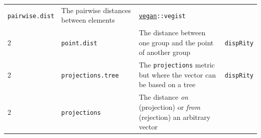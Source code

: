 \documentclass[]{book}
\begin{document}
\begin{longtable}[]{@{}llll@{}}
\begin{minipage}[t]{0.07\columnwidth}
\texttt{pairwise.dist}\strut
\end{minipage} & \begin{minipage}[t]{0.64\columnwidth}\raggedright
The pairwise distances between elements\strut
\end{minipage} & \begin{minipage}[t]{0.10\columnwidth}\raggedright
\href{https://cran.r-project.org/web/packages/vegan/index.html}{\texttt{vegan}}\texttt{::vegist}\strut
\end{minipage}\tabularnewline
\begin{minipage}[t]{0.07\columnwidth}\raggedright
2\strut
\end{minipage} & \begin{minipage}[t]{0.07\columnwidth}\raggedright
\texttt{point.dist}\strut
\end{minipage} & \begin{minipage}[t]{0.64\columnwidth}\raggedright
The distance between one group and the point of another group\strut
\end{minipage} & \begin{minipage}[t]{0.10\columnwidth}\raggedright
\texttt{dispRity}\strut
\end{minipage}\tabularnewline
\begin{minipage}[t]{0.07\columnwidth}\raggedright
2\strut
\end{minipage} & \begin{minipage}[t]{0.07\columnwidth}\raggedright
\texttt{projections.tree}\strut
\end{minipage} & \begin{minipage}[t]{0.64\columnwidth}\raggedright
The \texttt{projections} metric but where the vector can be based on a tree\strut
\end{minipage} & \begin{minipage}[t]{0.10\columnwidth}\raggedright
\texttt{dispRity}\strut
\end{minipage}\tabularnewline
\begin{minipage}[t]{0.07\columnwidth}\raggedright
2\strut
\end{minipage} & \begin{minipage}[t]{0.07\columnwidth}\raggedright
\texttt{projections}\strut
\end{minipage} & \begin{minipage}[t]{0.64\columnwidth}\raggedright
The distance \emph{on} (projection) or \emph{from} (rejection) an arbitrary vector\strut
\end{minipage} & \begin{minipage}[t]{0.10\columnwidth}\raggedright

\end{minipage}
\end{longtable}
\end{document}
